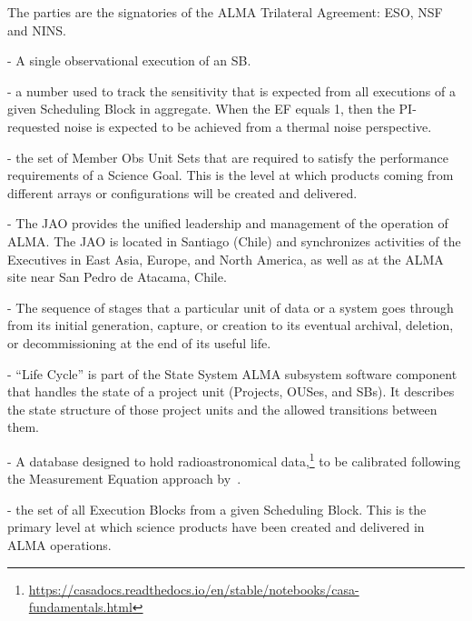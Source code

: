 \begin{description}
The parties are the signatories of the ALMA Trilateral Agreement: ESO, NSF and NINS.
\item[Execution Block (EB)] - A single observational execution of an SB.
\item[Execution Fraction (EF)] - a number used to track 
the sensitivity that is expected from all executions of a given Scheduling Block in aggregate. When the EF equals 1, then the PI-requested noise is expected to be achieved from a thermal noise perspective.
\item[Group Observing Unit Set (GOUS)] - the set of Member Obs Unit Sets that are required to satisfy the performance requirements of a Science Goal. This is the level at which products coming from different arrays or configurations will be created and delivered.
\item[Joint ALMA Observatory (JAO)] - The JAO provides the unified leadership and management of the operation of ALMA. The JAO is located in Santiago (Chile) and synchronizes activities of the Executives in East Asia, Europe, and North America, as well as at the ALMA site near San Pedro de Atacama, Chile. 
\item[lifecycle] - The sequence of stages that a particular unit of data or a system goes through from its initial generation, capture, or creation to its eventual archival, deletion, or decommissioning at the end of its useful life. 
\item[Life Cycle] - ``Life Cycle'' is part of the State System ALMA subsystem software component that handles the state of a project unit (Projects, OUSes, and SBs). It describes the state structure of those project units and the allowed transitions between them. 

\item[Measurement Set (MS)] - A database designed to hold radioastronomical data,\footnote{\url{https://casadocs.readthedocs.io/en/stable/notebooks/casa-fundamentals.html}} to be calibrated following the Measurement Equation approach by~\cite{Hamaker1996}.
\item[Member Observing Unit Set (MOUS)] - the set of all Execution Blocks from a given Scheduling Block. This is the primary level at which science products have been created and delivered in ALMA operations.


\end{description}
